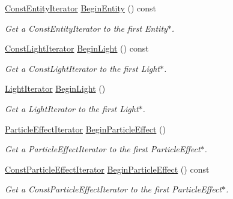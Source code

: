 \begin{DoxyCompactItemize}
\hyperlink{classMezzanine_1_1SceneManager_a6837ab4cd75f30af8159f18db973e497}{ConstEntityIterator} \hyperlink{classMezzanine_1_1SceneManager_a016bbb0dfd8a03e838d13131f298499f}{BeginEntity} () const 
\begin{DoxyCompactList}\small\item\em Get a ConstEntityIterator to the first Entity$\ast$. \item\end{DoxyCompactList}\item 
\hyperlink{classMezzanine_1_1SceneManager_a04a257d3df126110aa545e856853a663}{ConstLightIterator} \hyperlink{classMezzanine_1_1SceneManager_a5a50580c0389d0881dc8c1fb787370b2}{BeginLight} () const 
\begin{DoxyCompactList}\small\item\em Get a ConstLightIterator to the first Light$\ast$. \item\end{DoxyCompactList}\item 
\hyperlink{classMezzanine_1_1SceneManager_a70382bc80d3905971a04a77d5c6bcb33}{LightIterator} \hyperlink{classMezzanine_1_1SceneManager_a1571d4ee6e74d8f1be76c99281740221}{BeginLight} ()
\begin{DoxyCompactList}\small\item\em Get a LightIterator to the first Light$\ast$. \item\end{DoxyCompactList}\item 
\hyperlink{classMezzanine_1_1SceneManager_a5f3bd65fb09c7a08202083cc48e46fe7}{ParticleEffectIterator} \hyperlink{classMezzanine_1_1SceneManager_a97940bd86436528fdbdad5992bad4e0c}{BeginParticleEffect} ()
\begin{DoxyCompactList}\small\item\em Get a ParticleEffectIterator to the first ParticleEffect$\ast$. \item\end{DoxyCompactList}\item 
\hyperlink{classMezzanine_1_1SceneManager_ab1213cec08b0bc15ea58ed0d3617b887}{ConstParticleEffectIterator} \hyperlink{classMezzanine_1_1SceneManager_ac9e454fc20bdb1e1f118754994ff39e0}{BeginParticleEffect} () const 
\begin{DoxyCompactList}\small\item\em Get a ConstParticleEffectIterator to the first ParticleEffect$\ast$. \item\end{DoxyCompactList}\item 

\end{DoxyCompactItemize}
